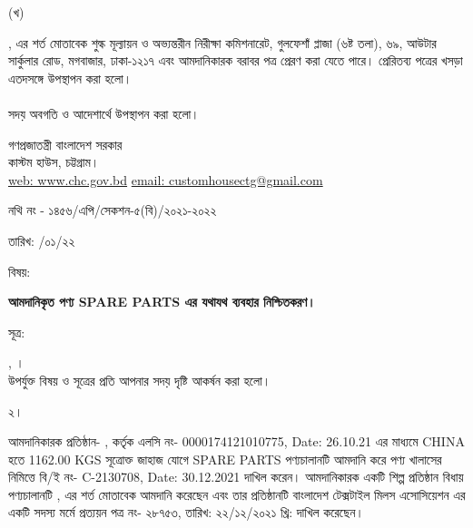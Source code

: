 \documentclass[12pt]{article}
\newcommand{\fileno}{নথি নং - ১৪৫৬/এপি/সেকশন-৫(বি)/২০২১-২০২২}
\newcommand{\fdt}{\hspace*{3em} তারিখ: \hspace{2.4em} /০১/২২}
\newcommand{\beno}{C-2130708}
\newcommand{\bedt}{30.12.2021}
\newcommand{\lcno}{0000174121010775}
\newcommand{\lcdt}{26.10.21}
\newcommand{\good}{SPARE PARTS}
\newcommand{\pkg}{1162.00 KGS}
\newcommand{\co}{CHINA}
\newcommand{\impn}{\jsml}
\newcommand{\impadd}{\jsmla}
\newcommand{\btmaltno}{প্রত্যয়ন পত্র নং- ২৮৭৫৩}
\newcommand{\btmaltnodt}{তারিখ:  ২২/১২/২০২১ খ্রি:}
\begin{document}
\begin{minipage}[t]{0.05\linewidth}
(খ)
\end{minipage}
\begin{minipage}[t]{0.90\linewidth}
{\srootz}, {\srootzd} এর শর্ত মোতাবেক
শুল্ক মূল্যায়ন ও অভ্যন্তরীন নিরীক্ষা কমিশনারেট,
গুলফেশাঁ প্লাজা (৬ষ্ট তলা), ৬৯, আউটার
সার্কুলার রোড, মগবাজার, ঢাকা-১২১৭ এবং
আমদানিকারক বরাবর পত্র প্রেরণ করা যেতে পারে।
প্রেরিতব্য পত্রের খসড়া এতদসঙ্গে উপস্থাপন করা হলো।
\\
\\
সদয় অবগতি ও আদেশার্থে উপস্থাপন করা
হলো।
\end{minipage}

\newpage
\begin{center}
\vspace*{6MM}
গণপ্রজাতন্ত্রী বাংলাদেশ সরকার
\\
\footnotesize{কাস্টম হাউস, চট্টগ্রাম।}
\\
\href{}{web: www.chc.gov.bd}\hspace{1em}
\href{}{email: customhousectg@gmail.com}
\end{center}
\begin{minipage}[t]{.70\linewidth}
{\fileno}
\end{minipage}
\begin{minipage}[t]{.30\linewidth}
{\fdt}
\\
\end{minipage}
\begin{minipage}[t]{.07\linewidth}
বিষয়:
\end{minipage}
\begin{minipage}[t]{.93\linewidth}
\textbf{আমদানিকৃত পণ্য {\good} এর যথাযথ ব্যবহার নিশ্চিতকরণ।}
\end{minipage}
\begin{minipage}[t]{.07\linewidth}
সূত্র:
\end{minipage}
\begin{minipage}[t]{.93\linewidth}
{\srootz}, {\srootzd}।
\\
উপর্যুক্ত বিষয় ও সূত্রের প্রতি আপনার সদয় দৃষ্টি
আকর্ষন করা হলো।
\\
\end{minipage}
\begin{minipage}[t]{.07\linewidth}
২।
\end{minipage}
\begin{minipage}[t]{.93\linewidth}
আমদানিকারক প্রতিষ্ঠান- {\impn}, {\impadd}
কর্তৃক এলসি নং- {\lcno}, Date: {\lcdt}
এর মাধ্যমে {\co} হতে
{\pkg} সূত্রোক্ত জাহাজ যোগে {\good}
পণ্যচালানটি আমদানি করে পণ্য
খালাসের নিমিত্তে বি/ই নং- {\beno}, Date: {\bedt}
দাখিল করেন। আমদানিকারক একটি
শিল্প প্রতিষ্ঠান বিধায় পণ্যচালানটি
{\srootz}, {\srootzd}
এর শর্ত মোতাবেক আমদানি করেছেন এবং
তার প্রতিষ্ঠানটি বাংলাদেশ টেক্সটাইল মিলস
এসোসিয়েশন এর একটি সদস্য মর্মে
{\btmaltno}, {\btmaltnodt}
দাখিল করেছেন।
\\
\end{minipage}
\end{document}
